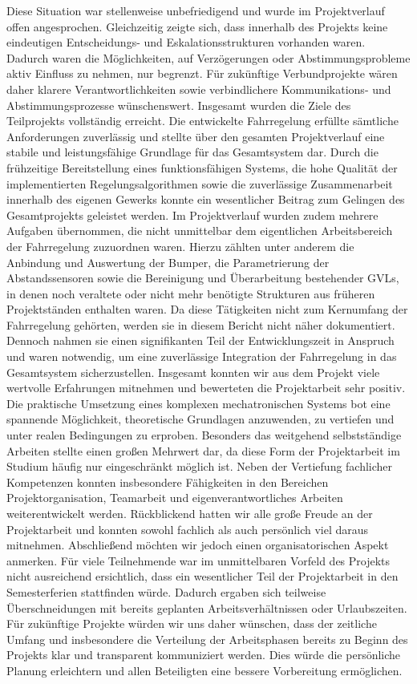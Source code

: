 Diese Situation war stellenweise unbefriedigend und wurde im Projektverlauf offen angesprochen. Gleichzeitig zeigte sich, dass innerhalb des Projekts keine eindeutigen Entscheidungs- und Eskalationsstrukturen vorhanden waren. Dadurch waren die Möglichkeiten, auf Verzögerungen oder Abstimmungsprobleme aktiv Einfluss zu nehmen, nur begrenzt. Für zukünftige Verbundprojekte wären daher klarere Verantwortlichkeiten sowie verbindlichere Kommunikations- und Abstimmungsprozesse wünschenswert.
Insgesamt wurden die Ziele des Teilprojekts vollständig erreicht. Die entwickelte Fahrregelung erfüllte sämtliche Anforderungen zuverlässig und stellte über den gesamten Projektverlauf eine stabile und leistungsfähige Grundlage für das Gesamtsystem dar. Durch die frühzeitige Bereitstellung eines funktionsfähigen Systems, die hohe Qualität der implementierten Regelungsalgorithmen sowie die zuverlässige Zusammenarbeit innerhalb des eigenen Gewerks konnte ein wesentlicher Beitrag zum Gelingen des Gesamtprojekts geleistet werden.
Im Projektverlauf wurden zudem mehrere Aufgaben übernommen, die nicht unmittelbar dem eigentlichen Arbeitsbereich der Fahrregelung zuzuordnen waren. Hierzu zählten unter anderem die Anbindung und Auswertung der Bumper, die Parametrierung der Abstandssensoren sowie die Bereinigung und Überarbeitung bestehender GVLs, in denen noch veraltete oder nicht mehr benötigte Strukturen aus früheren Projektständen enthalten waren. Da diese Tätigkeiten nicht zum Kernumfang der Fahrregelung gehörten, werden sie in diesem Bericht nicht näher dokumentiert. Dennoch nahmen sie einen signifikanten Teil der Entwicklungszeit in Anspruch und waren notwendig, um eine zuverlässige Integration der Fahrregelung in das Gesamtsystem sicherzustellen.
Insgesamt konnten wir aus dem Projekt viele wertvolle Erfahrungen mitnehmen und bewerteten die Projektarbeit sehr positiv. Die praktische Umsetzung eines komplexen mechatronischen Systems bot eine spannende Möglichkeit, theoretische Grundlagen anzuwenden, zu vertiefen und unter realen Bedingungen zu erproben. Besonders das weitgehend selbstständige Arbeiten stellte einen großen Mehrwert dar, da diese Form der Projektarbeit im Studium häufig nur eingeschränkt möglich ist. Neben der Vertiefung fachlicher Kompetenzen konnten insbesondere Fähigkeiten in den Bereichen Projektorganisation, Teamarbeit und eigenverantwortliches Arbeiten weiterentwickelt werden. Rückblickend hatten wir alle große Freude an der Projektarbeit und konnten sowohl fachlich als auch persönlich viel daraus mitnehmen.
Abschließend möchten wir jedoch einen organisatorischen Aspekt anmerken. Für viele Teilnehmende war im unmittelbaren Vorfeld des Projekts nicht ausreichend ersichtlich, dass ein wesentlicher Teil der Projektarbeit in den Semesterferien stattfinden würde. Dadurch ergaben sich teilweise Überschneidungen mit bereits geplanten Arbeitsverhältnissen oder Urlaubszeiten. Für zukünftige Projekte würden wir uns daher wünschen, dass der zeitliche Umfang und insbesondere die Verteilung der Arbeitsphasen bereits zu Beginn des Projekts klar und transparent kommuniziert werden. Dies würde die persönliche Planung erleichtern und allen Beteiligten eine bessere Vorbereitung ermöglichen.\\

